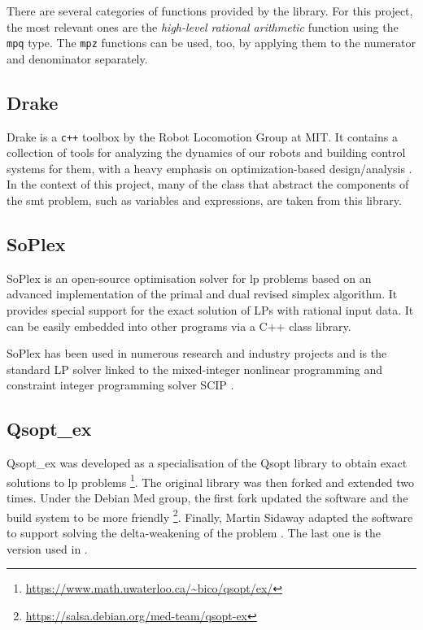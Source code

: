 There are several categories of functions provided by the library.
For this project, the most relevant ones are the \textit{high-level rational arithmetic} function using the \texttt{mpq} type.
The \texttt{mpz} functions can be used, too, by applying them to the numerator and denominator separately.

\subsection*{Drake}

Drake is a \texttt{c++} toolbox by the Robot Locomotion Group at MIT. 
It contains a collection of tools for analyzing the dynamics of our robots and building control systems for them, with a heavy emphasis on optimization-based design/analysis \cite{paper:drake}.
In the context of this project, many of the class that abstract the components of the \gls{smt} problem, such as variables and expressions, are taken from this library.

\subsection*{SoPlex}

SoPlex is an open-source optimisation solver for \gls{lp} problems based on an advanced implementation of the primal and dual revised simplex algorithm.
It provides special support for the exact solution of LPs with rational input data.
It can be easily embedded into other programs via a C++ class library.

SoPlex has been used in numerous research and industry projects and is the standard LP solver linked to the mixed-integer nonlinear programming and constraint integer programming solver SCIP \cite{man:soplex}.

\subsection*{Qsopt\_ex}

Qsopt\_ex was developed as a specialisation of the Qsopt library to obtain exact solutions to \gls{lp} problems \footnote{\url{https://www.math.uwaterloo.ca/~bico/qsopt/ex/}}.
The original library was then forked and extended two times.
Under the Debian Med group, the first fork updated the software and the build system to be more friendly \footnote{\url{https://salsa.debian.org/med-team/qsopt-ex}}.
Finally, Martin Sidaway adapted the software to support solving the delta-weakening of the problem \cite{repo:qsopt-ex}.
The last one is the version used in \dlinear.


